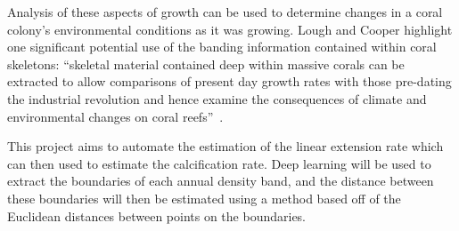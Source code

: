 Analysis of these aspects of growth can be used to determine changes in a coral colony's environmental conditions as it was growing. Lough and Cooper highlight one significant potential use of the banding information contained within coral skeletons: ``skeletal material contained deep within massive corals can be extracted to allow comparisons of present day growth rates with those pre-dating the industrial revolution and hence examine the consequences of climate and environmental changes on coral reefs''~\cite{lough2011new}.

This project aims to automate the estimation of the linear extension rate which can then used to estimate the calcification rate. Deep learning will be used to extract the boundaries of each annual density band, and the distance between these boundaries will then be estimated using a method based off of the Euclidean distances between points on the boundaries.

